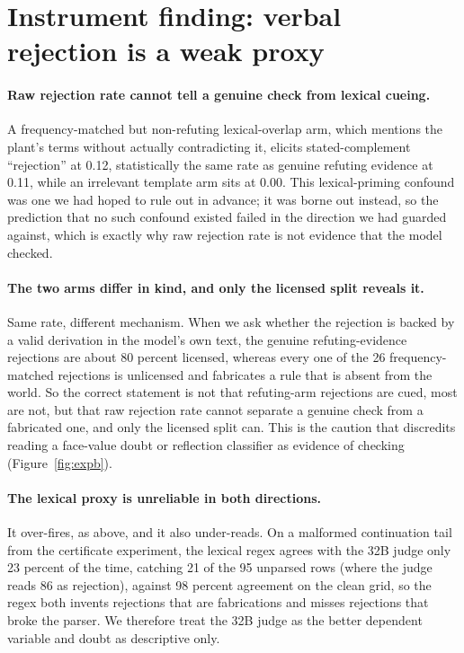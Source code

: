 \section{Instrument finding: verbal rejection is a weak proxy}
\label{sec:instrument}


\paragraph{Raw rejection rate cannot tell a genuine check from lexical
cueing.} A frequency-matched but non-refuting lexical-overlap arm, which
mentions the plant's terms without actually contradicting it, elicits
stated-complement ``rejection'' at 0.12, statistically the same rate as
genuine refuting evidence at 0.11, while an irrelevant template arm sits at
0.00.
This lexical-priming confound was one we had hoped to rule out in advance; it
was borne out instead, so the prediction that no such confound existed failed
in the direction we had guarded against, which is exactly why raw rejection
rate is not evidence that the model checked.

\paragraph{The two arms differ in kind, and only the licensed split reveals
it.} Same rate, different mechanism. When we ask whether the rejection is
backed by a valid derivation in the model's own text, the genuine
refuting-evidence rejections are about 80 percent licensed, whereas every
one of the 26 frequency-matched rejections is unlicensed and fabricates a
rule that is absent from the world.
So the correct statement is not that refuting-arm rejections are cued, most
are not, but that raw rejection rate cannot separate a genuine check from a
fabricated one, and only the licensed split can. This is the caution that
discredits reading a face-value doubt or reflection classifier as evidence
of checking (Figure~\ref{fig:expb}).

\paragraph{The lexical proxy is unreliable in both directions.} It
over-fires, as above, and it also under-reads. On a malformed continuation
tail from the certificate experiment, the lexical regex agrees with the 32B
judge only 23 percent of the time, catching 21 of the 95 unparsed rows
(where the judge reads 86 as rejection), against 98 percent agreement on the
clean grid, so the regex both
invents rejections that are fabrications and misses rejections that broke
the parser.
We therefore treat the 32B judge as the better dependent variable and doubt
as descriptive only.

